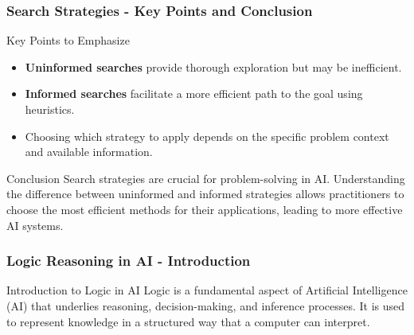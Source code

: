 \documentclass[aspectratio=169]{beamer}
\begin{document}
\begin{frame}[fragile]
    \frametitle{Search Strategies - Key Points and Conclusion}
    \begin{block}{Key Points to Emphasize}
        \begin{itemize}
            \item \textbf{Uninformed searches} provide thorough exploration but may be inefficient.
            \item \textbf{Informed searches} facilitate a more efficient path to the goal using heuristics.
            \item Choosing which strategy to apply depends on the specific problem context and available information.
        \end{itemize}
    \end{block}

    \begin{block}{Conclusion}
        Search strategies are crucial for problem-solving in AI. Understanding the difference between uninformed and informed strategies allows practitioners to choose the most efficient methods for their applications, leading to more effective AI systems.
    \end{block}
\end{frame}

\begin{frame}[fragile]
  \frametitle{Logic Reasoning in AI - Introduction}
  \begin{block}{Introduction to Logic in AI}
    Logic is a fundamental aspect of Artificial Intelligence (AI) that underlies reasoning, decision-making, and inference processes. 
    It is used to represent knowledge in a structured way that a computer can interpret.
  \end{block}
\end{frame}
\end{document}
